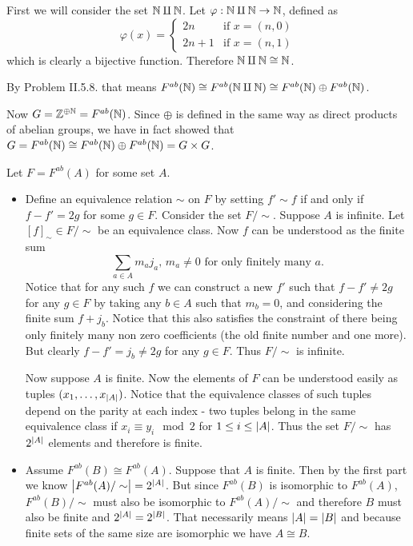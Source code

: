 \begin{problem}
\end{problem}

\begin{solution}
	First we will consider the set $\mathbb{N} \amalg \mathbb{N}$. Let $\varphi: \mathbb{N} \amalg \mathbb{N} \to \mathbb{N}$, defined as \[
		\varphi(x) =
			\begin{cases}
				2n & \text{if $x = (n, 0)$} \\
				2n + 1 & \text{if $x = (n, 1)$}
			\end{cases}
	\] which is clearly a bijective function. Therefore $\mathbb{N} \amalg \mathbb{N} \cong \mathbb{N}$.
	
	By Problem II.5.8. that means $F^{ab}(\mathbb{N}) \cong F^{ab}(\mathbb{N} \amalg \mathbb{N}) \cong F^{ab}(\mathbb{N}) \oplus F^{ab}(\mathbb{N})$.
	
	Now $G = \mathbb{Z}^{\oplus \mathbb{N}} = F^{ab}(\mathbb{N})$. Since $\oplus$ is defined in the same way as direct products of abelian groups, we have in fact showed that $G = F^{ab}(\mathbb{N}) \cong F^{ab}(\mathbb{N}) \oplus F^{ab}(\mathbb{N}) = G \times G$.
\end{solution}

\begin{problem}
\end{problem}

\begin{solution}
	Let $F = F^{ab}(A)$ for some set $A$.
	\begin{itemize}
		\item Define an equivalence relation $\sim$ on $F$ by setting $f' \sim f$ if and only if $f - f' = 2g$ for some $g \in F$. Consider the set $F/\sim$. Suppose $A$ is infinite. Let $[f]_\sim 
		\in F/\sim$ be an equivalence class. Now $f$ can be understood as the finite sum 
		\[
			\sum_{a \in A} m_a j_a \text{, $m_a \neq 0$ for only finitely many $a$.}
		\]
		Notice that for any such $f$ we can construct a new $f'$ such that $f - f' \neq 2g$ for any $g \in F$ by taking any $b \in A$ such that $m_b = 0$, and considering the finite sum $f + j_b$. Notice that this also satisfies the constraint of there being only finitely many non zero coefficients (the old finite number and one more). But clearly $f - f' = j_b \neq 2g$ for any $g \in F$. Thus $F/\sim$ is infinite.
		
		Now suppose $A$ is finite. Now the elements of $F$ can be understood easily as tuples $(x_1, \dots, x_{\left|A\right|})$. Notice that the equivalence classes of such tuples depend on the parity at each index - two tuples belong in the same equivalence class if $x_i \equiv y_i \mod 2$ for $1 \leq i \leq \left|A\right|$. Thus the set $F/\sim$ has $2^{\left|A\right|}$ elements and therefore is finite.
		\item Assume $F^{ab}(B) \cong F^{ab}(A)$. Suppose that $A$ is finite. Then by the first part we know $\left|F^{ab}(A)/\sim\right| = 2^{\left|A\right|}$. But since $F^{ab}(B)$ is isomorphic to $F^{ab}(A)$, $F^{ab}(B)/\sim$ must also be isomorphic to $F^{ab}(A)/\sim$ and therefore $B$ must also be finite and $2^{\left|A\right|} = 2^{\left|B\right|}$. That necessarily means $\left|A\right| = \left|B\right|$ and because finite sets of the same size are isomorphic we have $A \cong B$. \qedhere
	\end{itemize}
\end{solution}

